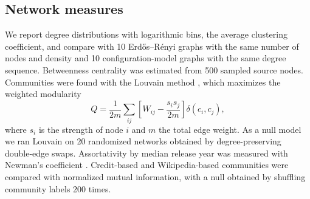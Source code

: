 \documentclass[9pt,twocolumn,twoside]{pnas-new}
\begin{document}
{\subsection*{Network measures}
We report degree distributions with logarithmic bins, the average clustering coefficient, and compare with 10 Erd\H{o}s--R\'enyi graphs \cite{erdos1959} with the same number of nodes and density and 10 configuration-model graphs \cite{molloy1995} with the same degree sequence. Betweenness centrality \cite{brandes2001} was estimated from 500 sampled source nodes. Communities were found with the Louvain method \cite{blondel2008}, which maximizes the weighted modularity \cite{newman2006}
\begin{equation}
Q = \frac{1}{2m}\sum_{ij}\left[W_{ij} - \frac{s_i s_j}{2m}\right]\delta(c_i, c_j),
\end{equation}
where $s_i$ is the strength of node $i$ and $m$ the total edge weight. As a null model we ran Louvain on 20 randomized networks obtained by degree-preserving double-edge swaps. Assortativity by median release year was measured with Newman's coefficient \cite{newman2003}. Credit-based and Wikipedia-based communities were compared with normalized mutual information, with a null obtained by shuffling community labels 200 times.

}
\end{document}
